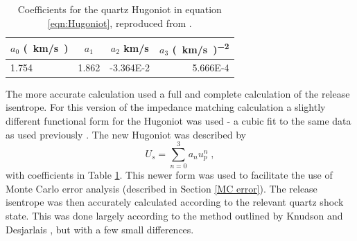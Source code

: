 
\begin{table}%
\centering
\caption{\label{tab:HugoniotCoeffs}%
Coefficients for the quartz Hugoniot in equation \ref{eqn:Hugoniot}, reproduced from \cite{Knudson2013}.
}
\begin{tabular}{lccr}
\hline\hline
\textrm{$a_0$ \si[per-mode=symbol]{(km/s)}}&
\textrm{$a_1$}&
\textrm{$a_2$ \si[per-mode=symbol]{\kilo\meter\per\second} }&
\textrm{$a_3$ \si[per-mode=symbol]{(km/s)^{-2}} } \\
\hline
1.754 & \num{1.862} & \num{-3.364E-2} & \num{5.666E-4}\\
\hline\hline
\end{tabular}
\end{table}

The more accurate calculation used a full and complete calculation of the release isentrope. For this version of the impedance matching calculation a slightly different functional form for the Hugoniot was used \cite{Knudson2013} - a cubic fit to the same data as used previously \cite{Knudson2009}. The new Hugoniot was described by \begin{equation} \label{eqn:Hugoniot} U_s = \sum_{n=0}^3 a_n u_p^n \;, \end{equation} with coefficients in Table \ref{tab:HugoniotCoeffs}. This newer form was used to facilitate the use of Monte Carlo error analysis (described in Section \ref{MC error}). The release isentrope was then accurately calculated according to the relevant quartz shock state. This was done largely according to the method outlined by Knudson and Desjarlais \cite{Knudson2013}, but with a few small differences. 

